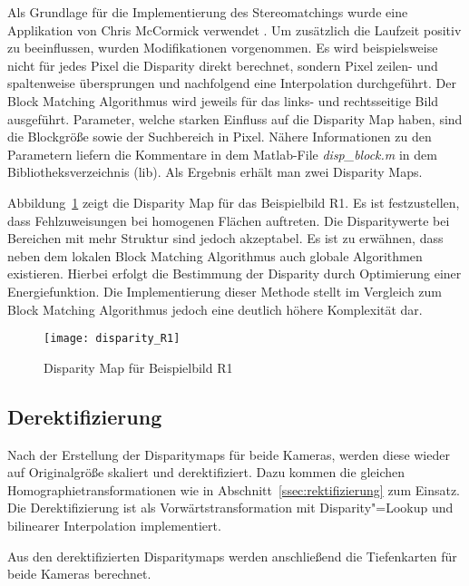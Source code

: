 Als Grundlage für die Implementierung des Stereomatchings wurde eine Applikation von Chris McCormick verwendet \cite{McCormick}. Um zusätzlich die Laufzeit positiv zu beeinflussen, wurden Modifikationen vorgenommen.
Es wird beispielsweise nicht für jedes Pixel die Disparity direkt berechnet, sondern Pixel zeilen- und spaltenweise übersprungen und nachfolgend eine Interpolation durchgeführt.
Der Block Matching Algorithmus wird jeweils für das links- und rechtsseitige Bild ausgeführt.
Parameter, welche starken Einfluss auf die Disparity Map haben, sind die Blockgröße sowie der Suchbereich in Pixel. 
Nähere Informationen zu den Parametern liefern die Kommentare in dem Matlab-File \textit{\grqq disp\_block.m\grqq} in dem Bibliotheksverzeichnis (lib).
Als Ergebnis erhält man zwei Disparity Maps.

Abbildung~\ref{fig:disparity_R1} zeigt die Disparity Map für das Beispielbild R1. Es ist festzustellen, dass Fehlzuweisungen bei homogenen Flächen auftreten. Die Disparitywerte bei Bereichen mit mehr Struktur sind jedoch akzeptabel.
Es ist zu erwähnen, dass neben dem lokalen Block Matching Algorithmus auch globale Algorithmen existieren. Hierbei erfolgt die Bestimmung der Disparity durch Optimierung einer Energiefunktion. Die Implementierung dieser Methode stellt im Vergleich zum Block Matching Algorithmus jedoch eine deutlich höhere Komplexität dar.

\begin{figure}[!hp]
	\centering
	\texttt{[image: disparity\_R1]}
	\caption{Disparity Map für Beispielbild R1}
	\label{fig:disparity_R1}
\end{figure}

\subsection{Derektifizierung}
Nach der Erstellung der Disparitymaps für beide Kameras, werden diese wieder auf Originalgröße skaliert und derektifiziert. Dazu kommen die gleichen Homographietransformationen wie in Abschnitt~\ref{ssec:rektifizierung} zum Einsatz. Die Derektifizierung ist als Vorwärtstransformation mit Disparity"=Lookup und bilinearer Interpolation implementiert.

Aus den derektifizierten Disparitymaps werden anschließend die Tiefenkarten für beide Kameras berechnet.